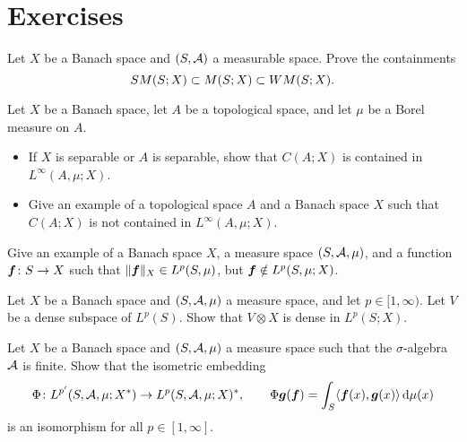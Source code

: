 \section*{Exercises}

\begin{exercise}\label{ex:measurability-containments}
  Let $X$ be a Banach space and $(S,\mathcal{A})$ a measurable space.
  Prove the containments
  \begin{equation*}
    SM(S;X) \subset M(S;X) \subset WM(S;X).
  \end{equation*}
\end{exercise}

\begin{exercise}
  Let $X$ be a Banach space, let $A$ be a topological space, and let $\mu$ be a Borel measure on $A$.
  \begin{itemize}
  \item If $X$ is separable or $A$ is separable, show that $C(A;X)$ is contained in $L^\infty(A, \mu;X)$.
  \item Give an example of a topological space $A$ and a Banach space $X$ such that $C(A;X)$ is not contained in $L^\infty(A,\mu;X)$.
  \end{itemize}
\end{exercise}

\begin{exercise}\label{ex:Lp-issues}
  Give an example of a Banach space $X$, a measure space $(S,\mathcal{A},\mu)$, and a function $\bm{f} \colon S \rightarrow X$ such that $\|\bm{f}\|_{X} \in L^p(S,\mu)$, but $\bm{f} \notin L^p(S,\mu;X)$.
\end{exercise}

\begin{exercise}\label{ex:general-density}
  Let $X$ be a Banach space and $(S,\mathcal{A},\mu)$ a measure space, and let $p \in [1,\infty)$.
  Let $V$ be a dense subspace of $L^p(S)$.
  Show that $V \otimes X$ is dense in $L^p(S;X)$.
\end{exercise}

\begin{exercise}\label{ex:finite-sigma-alg-duality}
  Let $X$ be a Banach space and $(S,\mathcal{A},\mu)$ a measure space such that the $\sigma$-algebra $\mathcal{A}$ is finite.
  Show that the isometric embedding
  \begin{equation*}
    \Phi \colon L^{p'}(S,\mathcal{A},\mu;X^*) \rightarrow L^p(S,\mathcal{A},\mu;X)^*, \qquad \Phi \bm{g}(\bm{f}) = \int_S \langle \bm{f}(x), \bm{g}(x) \rangle \, \mathrm{d}\mu(x)
  \end{equation*}
  is an isomorphism for all $p \in [1,\infty]$.
\end{exercise}

